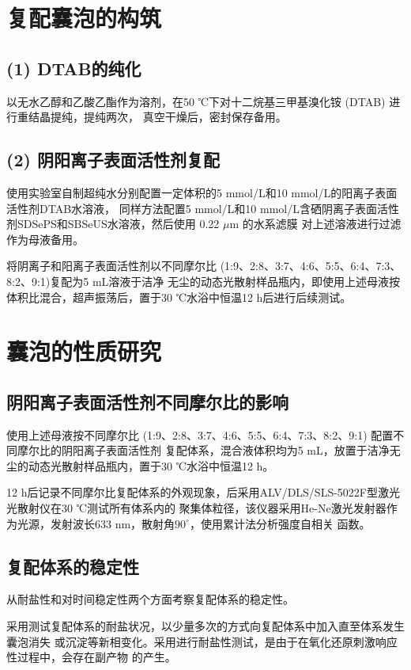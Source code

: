 \documentclass[bachelor,winfonts,replaceperiod]{jnuthesis}
\begin{document}
    \section{复配囊泡的构筑}
    \subsection*{(1) DTAB的纯化}
    以无水乙醇和乙酸乙酯作为溶剂，在50 ℃下对十二烷基三甲基溴化铵 (DTAB) 进行重结晶提纯，提纯两次，
    真空干燥后，密封保存备用。
    
    \subsection*{(2) 阴阳离子表面活性剂复配}
    使用实验室自制超纯水分别配置一定体积的5 mmol/L和10 mmol/L的阳离子表面活性剂DTAB水溶液，
    同样方法配置5 mmol/L和10 mmol/L含硒阴离子表面活性剂SDSePS和SBSeUS水溶液，然后使用 0.22 $\mu$m 的水系滤膜
    对上述溶液进行过滤作为母液备用。
    
    将阴离子和阳离子表面活性剂以不同摩尔比 (1:9、2:8、3:7、4:6、5:5、6:4、7:3、8:2、9:1)复配为5 mL溶液于洁净
    无尘的动态光散射样品瓶内，即使用上述母液按体积比混合，超声振荡后，置于30 ℃水浴中恒温12 h后进行后续测试。
        
    \section{囊泡的性质研究}
    \subsection{阴阳离子表面活性剂不同摩尔比的影响}
    使用上述母液按不同摩尔比 (1:9、2:8、3:7、4:6、5:5、6:4、7:3、8:2、9:1) 配置不同摩尔比的阴阳离子表面活性剂
    复配体系，混合液体积均为5 mL，放置于洁净无尘的动态光散射样品瓶内，置于30 ℃水浴中恒温12 h。
    
    12 h后记录不同摩尔比复配体系的外观现象，后采用ALV/DLS/SLS-5022F型激光光散射仪在30 ℃测试所有体系内的
    聚集体粒径，该仪器采用He-Ne激光发射器作为光源，发射波长633 nm，散射角$90^\circ$，使用累计法分析强度自相关
    函数。
    
    \subsection{复配体系的稳定性}
    从耐盐性和对时间稳定性两个方面考察复配体系的稳定性。
    
    采用测试复配体系的耐盐状况，以少量多次的方式向复配体系中加入直至体系发生囊泡消失
    或沉淀等新相变化。采用进行耐盐性测试，是由于在氧化还原刺激响应性过程中，会存在副产物  
    的产生。
    
\end{document}
